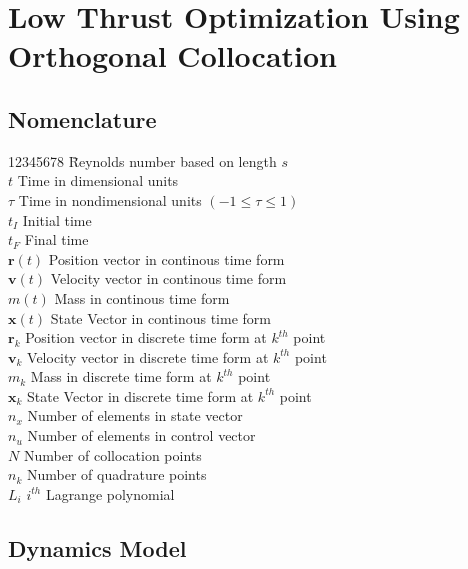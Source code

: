 \chapter{Low Thrust Optimization Using Orthogonal Collocation} \label{Ch:OrthogonalCollocation} 

\section{Nomenclature}

\begin{tabbing}
12345678 \= Reynolds number based on length $s$ \kill\\
$t$  \>   Time in dimensional units \\
$\tau$  \>  Time in nondimensional units $(-1 \leq \tau \leq 1)$\\
$t_I$  \>   Initial time \\
$t_F$  \>  Final time\\
$\mathbf{r}(t)$        \> Position vector in continous time form\\
$\mathbf{v}(t)$        \> Velocity vector in continous time form\\
$m(t)$        \> Mass in continous time form\\
$\mathbf{x}(t)$   \>  State Vector in continous time form\\
$\mathbf{r}_k$        \> Position vector in discrete time form at $k^{th}$ point\\
$\mathbf{v}_k$        \> Velocity vector in discrete time form at $k^{th}$ point\\
$m_k$        \> Mass in discrete time form at $k^{th}$ point\\
$\mathbf{x}_k$   \>  State Vector in discrete time form at $k^{th}$ point\\
$n_x$              \> Number of elements in state vector\\
$n_u$              \> Number of elements in control vector\\
$N$              \> Number of collocation points\\
$n_k$              \> Number of quadrature points \\
$L_i$              \> $i^{th}$ Lagrange polynomial \\
\end{tabbing}

\section{Dynamics Model}

